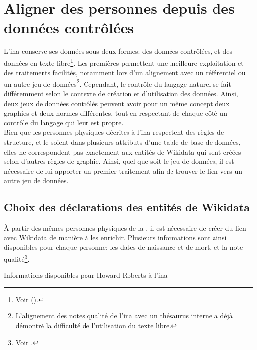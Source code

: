 \section{\label{II-C-2}Aligner des personnes depuis des données contrôlées}

L'\ac{ina} conserve ses données sous deux formes: des données contrôlées, et des données en texte libre\footnote{Voir  ().}. Les premières permettent une meilleure exploitation et des traitements facilités, notamment lors d'un alignement avec un référentiel ou un autre jeu de données\footnote{L'alignement des notes qualité de l'\ac{ina} avec un thésaurus interne a déjà démontré la difficulté de l'utilisation du texte libre.}. Cependant, le contrôle du langage naturel se fait différemment selon le contexte de création et d'utilisation des données. Ainsi, deux jeux de données contrôlés peuvent avoir pour un même concept deux graphies et deux normes différentes, tout en respectant de chaque côté un contrôle du langage qui leur est propre.\\

Bien que les personnes physiques décrites à l'\ac{ina} respectent des règles de structure, et le soient dans plusieurs attributs d'une table de base de données, elles ne correspondent pas exactement aux entités de Wikidata qui sont créées selon d'autres règles de graphie. Ainsi, quel que soit le jeu de données, il est nécessaire de lui apporter un premier traitement afin de trouver le lien vers un autre jeu de données.

\subsection{\label{II-C-2-a}Choix des déclarations des entités de Wikidata}

À partir des mêmes personnes physiques de la , il est nécessaire de créer du lien avec Wikidata de manière à les enrichir. Plusieurs informations sont ainsi disponibles pour chaque personne: les dates de naissance et de mort, et la note qualité\footnote{Voir .}.
\begin{table}[!h]
	\centering
	\caption{Informations disponibles pour Howard Roberts à l'\ac{ina}}
	\label{table_roberts_1}
\end{table}
\medskip

